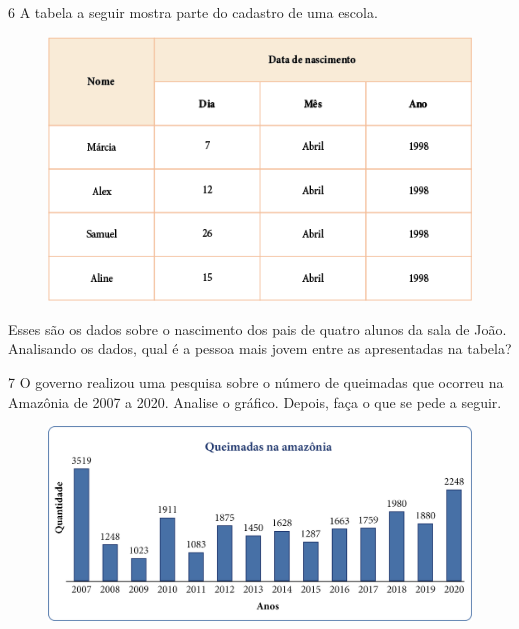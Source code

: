\pagebreak
\num{6} A tabela a seguir mostra parte do cadastro de uma escola.

\begin{figure}[htpb!]
\centering
\includegraphics[width=.8\textwidth]{media/image45.png}
\end{figure}

Esses são os dados sobre o nascimento dos pais de quatro alunos da sala
de João. Analisando os dados, qual é a pessoa mais jovem
entre as apresentadas na tabela? 

\num{7} O governo realizou uma pesquisa sobre o número de queimadas que
ocorreu na Amazônia de 2007 a 2020. Analise o gráfico. Depois, faça o que se pede a seguir.


\begin{figure}[htpb!]
\centering
\includegraphics[width=.7\textwidth]{media/image46.png}
\end{figure}

